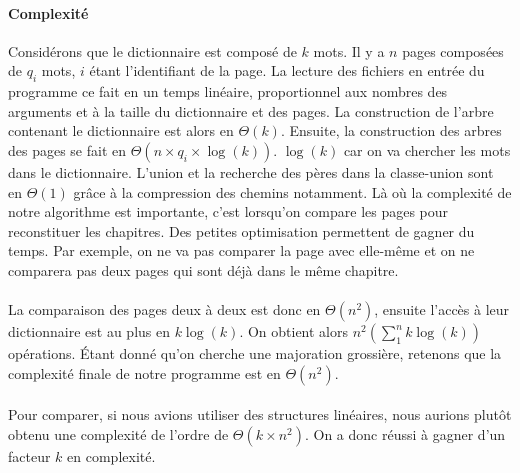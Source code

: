 \documentclass[a4paper]{article}
\begin{document}
		 	\paragraph{Complexité}{
		 	Considérons que le dictionnaire est composé de $k$ mots. Il y a $n$ pages composées de
		 	$q_{i}$ mots, $i$ étant l'identifiant de la page. \newline
		 	La lecture des fichiers en entrée du programme ce fait en un temps linéaire, proportionnel aux
		 	nombres des arguments et à la taille du dictionnaire et des pages. La construction de l'arbre
		 	contenant le dictionnaire est alors en $\Theta(k)$. \newline
		 	Ensuite, la construction des arbres des pages se fait en $\Theta(n \times q_{i} \times \log(k))$.
		 	$\log(k)$ car on va chercher les mots dans le dictionnaire.
		 	L'union et la recherche des pères dans la classe-union sont en $\Theta(1)$ grâce à la compression des
		 	chemins notamment. Là où la complexité de notre algorithme est importante, c'est lorsqu'on compare les pages
		 	pour reconstituer les chapitres. Des petites optimisation permettent de gagner du temps. Par exemple,
		 	on ne va pas comparer la page avec elle-même et on ne comparera pas deux pages qui sont déjà dans le
		 	même chapitre.
		 	}
		 	\paragraph{}{
		 	La comparaison des pages deux à deux est donc en $\Theta(n^{2})$, ensuite l'accès à leur
		 	dictionnaire est au plus en $k\log(k)$. On obtient alors $n^{2}( \sum_{1}^{n} k\log(k))$ opérations.
		 	Étant donné qu'on cherche une majoration grossière, retenons que la complexité finale de 
		 	notre programme est en $\Theta(n^{2})$.
		 	}
		 	\paragraph{}{
		 	Pour comparer, si nous avions utiliser des structures linéaires, nous aurions plutôt obtenu une
		 	complexité de l'ordre de $\Theta(k \times n^{2})$. On a donc réussi à gagner d'un facteur $k$
		 	en complexité.
		 	}
		 	
\end{document}
